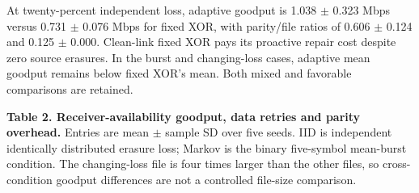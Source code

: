\documentclass[11pt,a4paper]{article}
\begin{document}
At twenty-percent independent loss, adaptive goodput is 1.038 $\pm$ 0.323 Mbps versus 0.731 $\pm$ 0.076 Mbps for fixed XOR, with parity/file ratios of 0.606 $\pm$ 0.124 and 0.125 $\pm$ 0.000. Clean-link fixed XOR pays its proactive repair cost despite zero source erasures. In the burst and changing-loss cases, adaptive mean goodput remains below fixed XOR's mean. Both mixed and favorable comparisons are retained.

\begin{samepage}
\textbf{Table 2. Receiver-availability goodput, data retries and parity overhead.} Entries are mean $\pm$ sample SD over five seeds. IID is independent identically distributed erasure loss; Markov is the binary five-symbol mean-burst condition. The changing-loss file is four times larger than the other files, so cross-condition goodput differences are not a controlled file-size comparison.


\end{samepage}
\end{document}
